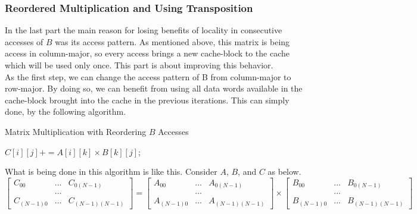 \documentclass[paper=a4, fontsize=11pt]{scrartcl} %
\numberwithin{equation}{section} %
\numberwithin{figure}{section} %
\numberwithin{table}{section} %
\begin{document}
\subsubsection{Reordered Multiplication and Using Transposition}
In the last part the main reason for losing benefits of locality in consecutive accesses of $B$ was its access pattern. As mentioned above, this matrix is being access in column-major, so every access brings a new cache-block to the cache which will be used only once. This part is about improving this behavior.\\
As the first step, we can change the access pattern of B from column-major to row-major. By doing so, we can benefit from using all data words available in the cache-block brought into the cache in the previous iterations. This can simply done, by the following algorithm.\\

\begin{algorithm}
\caption{Matrix Multiplication with Reordering $B$ Accesses}
\label{Reorder-Alg}
\begin{algorithmic}
		\State $C[ i ][ j ] += A[ i ][ k ] \times B[ k ][ j ]$; 
		\EndFor
	\EndFor
\EndFor
\end{algorithmic}
\end{algorithm}

What is being done in this algorithm is like this. Consider $A$, $B$, and $C$ as below.
\begin{equation*}
\begin{bmatrix}
C_{00} & ... & C_{0(N-1)} \\
 &...&\\
C_{(N-1)0} & ... & C_{(N-1)(N-1)}
\end{bmatrix} = 
\begin{bmatrix}
A_{00} & ... & A_{0(N-1)} \\
 &...&\\
A_{(N-1)0} & ... & A_{(N-1)(N-1)}
\end{bmatrix} \times
\begin{bmatrix}
B_{00} & ... & B_{0(N-1)} \\
 &...&\\
B_{(N-1)0} & ... & B_{(N-1)(N-1)}
\end{bmatrix}
\end{equation*}
\end{document}
